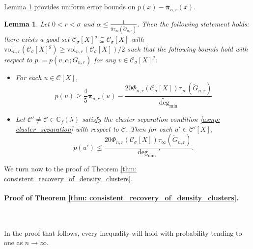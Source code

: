 \documentclass[11pt,twoside]{article}
\newtheorem{lemma}{Lemma}
\newcommand{\vol}{\mathrm{vol}}
\newcommand{\1}{\mathbf{1}}
\newcommand{\pbf}{p}        %
\newcommand{\pibf}{\bm{\pi}}
\newcommand{\Xbf}{X}             %
\newcommand{\Cbb}{\mathbb{C}}
\newcommand{\Cset}{\mathcal{C}}
\newcommand{\Csig}{\Cset_{\sigma}}
\newcommand{\degminpr}{\deg_{\min}'}
\newcommand{\degminwt}{\widetilde{\deg}_{\min}}
\begin{document}
Lemma \ref{lem: setup} provides uniform error bounds on $\pbf(x) - \overline{\pibf}_{n,r}(x)$. 

\begin{lemma} 
	\label{lem: setup}
	Let $0 < r < \sigma$ and $\alpha \leq \frac{1}{9 \tau_{\infty}(\widetilde{G}_{n,r})}$. Then the following statement holds: there exists a good set $\Csig[\Xbf]^g \subseteq \Csig[\Xbf]$ with $\vol_{n,r}(\Csig[\Xbf]^g) \geq \vol_{n,r}(\Csig[\Xbf])/2$ such that the following bounds hold with respect to $\pbf := \pbf(v,\alpha;G_{n,r})$ for any $v \in \Csig[\Xbf]^g$:
	\begin{itemize}
		\item For each $u \in \Cset[\Xbf]$,
		\begin{equation}
		\label{eqn: lower_bound_PPR_in_cluster}
		\pbf(u) \geq \frac{4}{5} \overline{\pibf}_{n,r}(u) - \frac{20 \Phi_{n,r}(\Csig[\Xbf]) \tau_{\infty}(\widetilde{G}_{n,r})}{\degminwt}
		\end{equation}
		\item Let $\Cset' \neq \Cset \in \Cbb_f(\lambda)$ satisfy the cluster separation condition \ref{asmp: cluster_separation} with respect to $\Cset$. Then for each $u' \in \Cset'[\Xbf]$,
		\begin{equation}
		\label{eqn: upper_bound_PPR_in_other_cluster}
		\pbf(u') \leq \frac{20 \Phi_{n,r}(\Csig[\Xbf]) \tau_{\infty}(\widetilde{G}_{n,r})}{\degminpr}.
		\end{equation}
	\end{itemize}
\end{lemma}

We turn now to the proof of Theorem \ref{thm: consistent_recovery_of_density_clusters}.

\paragraph{Proof of Theorem \ref{thm: consistent_recovery_of_density_clusters}.}
~

In the proof that follows, every inequality will hold with probability tending to one as $n \to \infty$.
\end{document}

